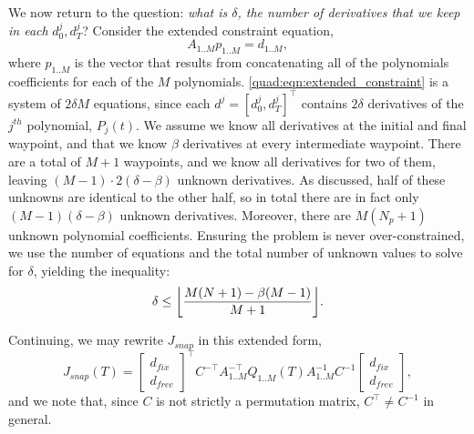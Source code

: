 We now return to the question: \emph{what is $\delta$, the number of derivatives that we keep in each} $d_0^j, d_T^j$? Consider the extended constraint equation,
\begin{equation}
    A_{1..M} p_{1..M} = d_{1..M},
\label{quad:eqn:extended_constraint}
\end{equation}
where $p_{1..M}$ is the vector that results from concatenating all of the polynomials coefficients for each of the $M$ polynomials. \autoref{quad:eqn:extended_constraint} is a system of $2\delta M$ equations, since each $d^j = {[d_0^j, d_T^j]}^\top$ contains $2\delta$ derivatives of the $j^{th}$ polynomial, $P_j(t)$. We assume we know all derivatives at the initial and final waypoint, and that we know $\beta$ derivatives at every intermediate waypoint. There are a total of $M+1$ waypoints, and we know all derivatives for two of them, leaving $(M-1)\cdot 2(\delta - \beta)$ unknown derivatives. As discussed, half of these unknowns are identical to the other half, so in total there are in fact only $(M-1)(\delta-\beta)$ unknown derivatives. Moreover, there are $M(N_p + 1)$ unknown polynomial coefficients. Ensuring the problem is never over-constrained, we use the number of equations and the total number of unknown values to solve for $\delta$, yielding the inequality:
\begin{equation}
    \delta \leq \floor*{\frac{M(N+1) - \beta(M-1)}{M+1}}.
\label{quad:eqn:delta}
\end{equation}

Continuing, we may rewrite $J_{snap}$ in this extended form,
\begin{equation}
    J_{snap}(T) = {\begin{bmatrix}
                        d_{fix} \\
                        d_{free}
                   \end{bmatrix}}^\top
                   C^{-\top} A_{1..M}^{-\top} Q_{1..M}(T) A_{1..M}^{-1} C^{-1}
                   \begin{bmatrix}
                        d_{fix} \\
                        d_{free}
                   \end{bmatrix},
\end{equation}
and we note that, since $C$ is not strictly a permutation matrix, $C^\top \neq C^{-1}$ in general.

